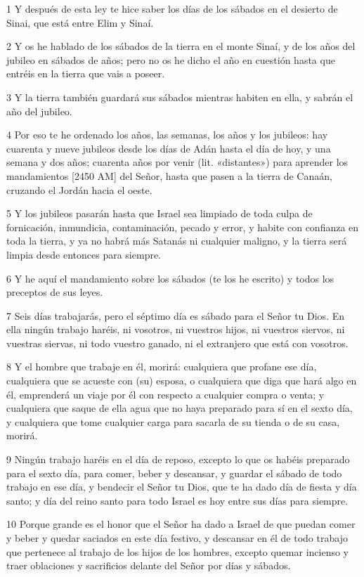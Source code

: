 \par 1 Y después de esta ley te hice saber los días de los sábados en el desierto de Sinai, que está entre Elim y Sinaí.
\par 2 Y os he hablado de los sábados de la tierra en el monte Sinaí, y de los años del jubileo en sábados de años; pero no os he dicho el año en cuestión hasta que entréis en la tierra que vais a poseer.
\par 3 Y la tierra también guardará sus sábados mientras habiten en ella, y sabrán el año del jubileo.
\par 4 Por eso te he ordenado los años, las semanas, los años y los jubileos: hay cuarenta y nueve jubileos desde los días de Adán hasta el día de hoy, y una semana y dos años; cuarenta años por venir (lit. «distantes») para aprender los mandamientos [2450 AM] del Señor, hasta que pasen a la tierra de Canaán, cruzando el Jordán hacia el oeste.
\par 5 Y los jubileos pasarán hasta que Israel sea limpiado de toda culpa de fornicación, inmundicia, contaminación, pecado y error, y habite con confianza en toda la tierra, y ya no habrá más Satanás ni cualquier maligno, y la tierra será limpia desde entonces para siempre.
\par 6 Y he aquí el mandamiento sobre los sábados (te los he escrito) y todos los preceptos de sus leyes.
\par 7 Seis días trabajarás, pero el séptimo día es sábado para el Señor tu Dios. En ella ningún trabajo haréis, ni vosotros, ni vuestros hijos, ni vuestros siervos, ni vuestras siervas, ni todo vuestro ganado, ni el extranjero que está con vosotros.
\par 8 Y el hombre que trabaje en él, morirá: cualquiera que profane ese día, cualquiera que se acueste con (su) esposa, o cualquiera que diga que hará algo en él, emprenderá un viaje por él con respecto a cualquier compra o venta; y cualquiera que saque de ella agua que no haya preparado para sí en el sexto día, y cualquiera que tome cualquier carga para sacarla de su tienda o de su casa, morirá.
\par 9 Ningún trabajo haréis en el día de reposo, excepto lo que os habéis preparado para el sexto día, para comer, beber y descansar, y guardar el sábado de todo trabajo en ese día, y bendecir el Señor tu Dios, que te ha dado día de fiesta y día santo; y día del reino santo para todo Israel es hoy entre sus días para siempre.
\par 10 Porque grande es el honor que el Señor ha dado a Israel de que puedan comer y beber y quedar saciados en este día festivo, y descansar en él de todo trabajo que pertenece al trabajo de los hijos de los hombres, excepto quemar incienso y traer oblaciones y sacrificios delante del Señor por días y sábados.
